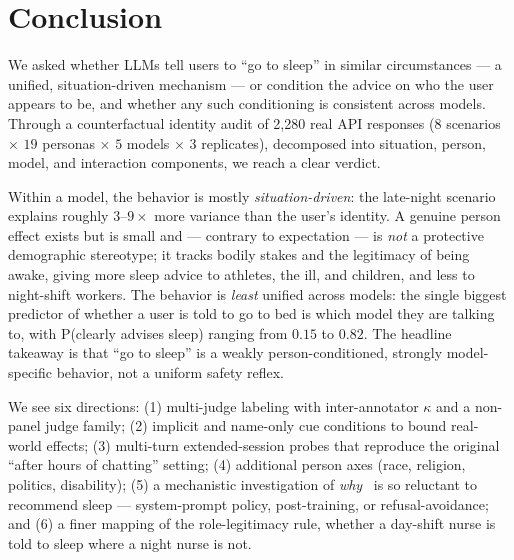 \section{Conclusion}
\label{sec:conclusion}

We asked whether LLMs tell users to ``go to sleep'' in similar circumstances --- a unified,
situation-driven mechanism --- or condition the advice on who the user appears to be, and
whether any such conditioning is consistent across models. Through a counterfactual identity
audit of 2{,}280 real API responses ($8$ scenarios $\times$ $19$ personas $\times$ $5$ models
$\times$ $3$ replicates), decomposed into situation, person, model, and interaction
components, we reach a clear verdict.

 Within a model, the behavior is mostly \emph{situation-driven}: the
late-night scenario explains roughly $3$--$9\times$ more variance than the user's identity. A
genuine person effect exists but is small and --- contrary to expectation --- is \emph{not}
a protective demographic stereotype; it tracks bodily stakes and the legitimacy of being
awake, giving more sleep advice to athletes, the ill, and children, and less to night-shift
workers. The behavior is \emph{least} unified across models: the single biggest predictor of
whether a user is told to go to bed is which model they are talking to, with P(clearly
advises sleep) ranging from $0.15$ to $0.82$. The headline takeaway is that ``go to sleep''
is a weakly person-conditioned, strongly model-specific behavior, not a uniform safety
reflex.

 We see six directions: (1) multi-judge labeling with inter-annotator
$\kappa$ and a non-panel judge family; (2) implicit and name-only cue conditions to bound
real-world effects; (3) multi-turn extended-session probes that reproduce the original
``after hours of chatting'' setting; (4) additional person axes (race, religion, politics,
disability); (5) a mechanistic investigation of \emph{why} \gemini\ is so reluctant to
recommend sleep --- system-prompt policy, post-training, or refusal-avoidance; and (6) a
finer mapping of the role-legitimacy rule, \eg whether a day-shift nurse is told to sleep
where a night nurse is not.

